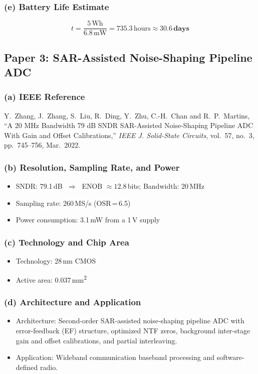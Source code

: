 \documentclass{article}
\begin{document}
  \subsubsection*{(e) Battery Life Estimate}
  \[
      t = \frac{5\,\text{Wh}}{6.8\,\text{mW}} = 735.3\,\text{hours} \approx \mathbf{30.6\,\text{days}}
  \]

  \subsection{Paper 3: SAR-Assisted Noise-Shaping Pipeline ADC}

  \subsubsection*{(a) IEEE Reference}
  Y.~Zhang, J.~Zhang, S.~Liu, R.~Ding, Y.~Zhu, C.-H.~Chan and R.~P.~Martins,
  ``A 20 MHz Bandwidth 79 dB SNDR SAR-Assisted Noise-Shaping Pipeline ADC With Gain and Offset Calibrations,''
  \textit{IEEE J. Solid-State Circuits}, vol.~57, no.~3, pp.~745--756, Mar.~2022.

  \subsubsection*{(b) Resolution, Sampling Rate, and Power}
  \begin{itemize}
      \item SNDR: 79.1\,dB $\;\Rightarrow\;$ ENOB $\approx 12.8$\,bits; Bandwidth: 20\,MHz
      \item Sampling rate: 260\,MS/s (OSR\,=\,6.5)
      \item Power consumption: 3.1\,mW from a 1\,V supply
  \end{itemize}

  \subsubsection*{(c) Technology and Chip Area}
  \begin{itemize}
      \item Technology: 28\,nm CMOS
      \item Active area: 0.037\,mm\textsuperscript{2}
  \end{itemize}

  \subsubsection*{(d) Architecture and Application}
  \begin{itemize}
      \item Architecture: Second-order SAR-assisted noise-shaping pipeline ADC with error-feedback (EF) structure, optimized NTF
   zeros, background inter-stage gain and offset calibrations, and partial interleaving.
      \item Application: Wideband communication baseband processing and software-defined radio.
  \end{itemize}
\end{document}
